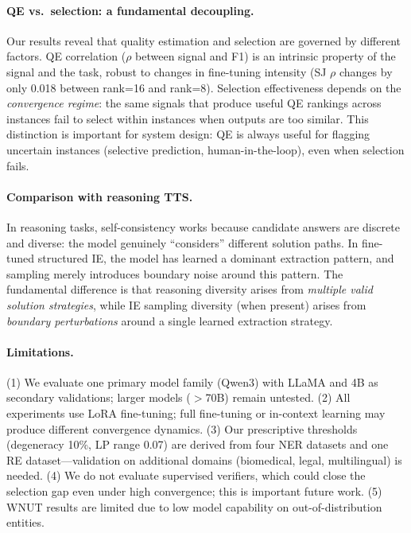 \documentclass[11pt,a4paper]{article}
\begin{document}
\paragraph{QE vs.\ selection: a fundamental decoupling.}
Our results reveal that quality estimation and selection are governed by different factors.
QE correlation ($\rho$ between signal and F1) is an intrinsic property of the signal and the task, robust to changes in fine-tuning intensity (SJ $\rho$ changes by only 0.018 between rank=16 and rank=8).
Selection effectiveness depends on the \emph{convergence regime}: the same signals that produce useful QE rankings across instances fail to select within instances when outputs are too similar.
This distinction is important for system design: QE is always useful for flagging uncertain instances (selective prediction, human-in-the-loop), even when selection fails.

\paragraph{Comparison with reasoning TTS.}
In reasoning tasks, self-consistency works because candidate answers are discrete and diverse: the model genuinely ``considers'' different solution paths.
In fine-tuned structured IE, the model has learned a dominant extraction pattern, and sampling merely introduces boundary noise around this pattern.
The fundamental difference is that reasoning diversity arises from \emph{multiple valid solution strategies}, while IE sampling diversity (when present) arises from \emph{boundary perturbations} around a single learned extraction strategy.

\paragraph{Limitations.}
(1) We evaluate one primary model family (Qwen3) with LLaMA and 4B as secondary validations; larger models ($>$70B) remain untested.
(2) All experiments use LoRA fine-tuning; full fine-tuning or in-context learning may produce different convergence dynamics.
(3) Our prescriptive thresholds (degeneracy 10\%, LP range 0.07) are derived from four NER datasets and one RE dataset---validation on additional domains (biomedical, legal, multilingual) is needed.
(4) We do not evaluate supervised verifiers, which could close the selection gap even under high convergence; this is important future work.
(5) WNUT results are limited due to low model capability on out-of-distribution entities.
\end{document}

